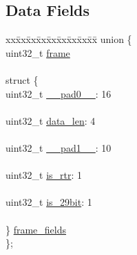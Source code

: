 \subsection*{Data Fields}
\begin{DoxyCompactItemize}
\item 
\begin{tabbing}
xx\=xx\=xx\=xx\=xx\=xx\=xx\=xx\=xx\=\kill
union \{\\
\>uint32\_t \hyperlink{struct____attribute_____a1c5c34a070f4e1a8c388cc990166125a}{frame}\\
\>\\
\>struct \{\\
\>\>uint32\_t \hyperlink{struct____attribute_____a02ee404618bb2bb7a588a4ad5927894d}{\_\_pad0\_\_}: 16\\
\>\>\\
\>\>uint32\_t \hyperlink{struct____attribute_____ae6f628b8af2722362b91666d5cff6041}{data\_len}: 4\\
\>\>\\
\>\>uint32\_t \hyperlink{struct____attribute_____a0c4e6e1eb99bec0a27a70420f40ac211}{\_\_pad1\_\_}: 10\\
\>\>\\
\>\>uint32\_t \hyperlink{struct____attribute_____afa1cea6cf94468a29ce2ad1b62a3de11}{is\_rtr}: 1\\
\>\>\\
\>\>uint32\_t \hyperlink{struct____attribute_____a745166911ddda34c6f9e95e22d423207}{is\_29bit}: 1\\
\>\>\\
\>\} \hyperlink{struct____attribute_____acfc363edc99eccae8f7e0f523821305e}{frame\_fields}\\
\}; \\


\end{tabbing}
\end{DoxyCompactItemize}
